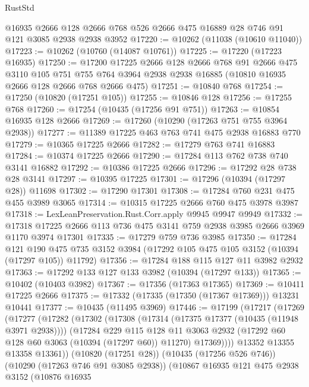 \begin{lexlean}{RustStd}
\begin{coremodule}
    @16935
    @2666
    @128
    @2666
    @768
    @526
    @2666
    @475
    @16889
    @28
    @746
    @91
    @121
    @3085
    @2938
    @2938
    @3952
@17220 := @10262 (@11038 (@10610 @11040))
@17223 := @10262 (@10760 (@14087 @10761))
@17225 := @17220 (@17223 @16935)
@17250 := @17200
    @17225
    @2666
    @128
    @2666
    @768
    @91
    @2666
    @475
    @3110
    @105
    @751
    @755
    @764
    @3964
    @2938
    @2938
    @16885
    (@10810 @16935 @2666 @128 @2666 @768 @2666 @475)
@17251 := @10840 @768
@17254 := @17250 (@10820 (@17251 @105))
@17255 := @10846 @128
@17256 := @17255 @768
@17260 := @17254 (@10435 (@17256 @91 @751))
@17263 := @10854 @16935 @128 @2666
@17269 := @17260 (@10290 (@17263 @751 @755 @3964 @2938))
@17277 := @11389 @17225 @463 @763 @741 @475 @2938 @16883 @770
@17279 := @10365 @17225 @2666
@17282 := @17279 @763 @741 @16883
@17284 := @10374 @17225 @2666
@17290 := @17284 @113 @762 @738 @740 @3141 @16882
@17292 := @10386 @17225 @2666
@17296 := @17292 @28 @738 @28 @3141
@17297 := @10395 @17225
@17301 := @17296 (@10394 (@17297 @28)) @11698
@17302 := @17290 @17301
@17308 := @17284 @760 @231 @475 @455 @3989 @3065
@17314 := @10315 @17225 @2666 @760 @475 @3978 @3987
@17318 := LexLeanPreservation.Rust.Corr.apply @9945 @9947 @9949
@17332 := @17318 @17225 @2666 @113 @736 @475 @3141 @759 @2938 @3985 @2666 @3969 @1170 @3974 @17301
@17335 := @17279 @759 @736 @3985
@17350 := @17284
    @121
    @190
    @475
    @735
    @3152
    @3984
    (@17292 @105 @475 @105 @3152 (@10394 (@17297 @105)) @11792)
@17356 := @17284 @188 @115 @127 @11 @3982 @2932
@17363 := @17292 @133 @127 @133 @3982 (@10394 (@17297 @133))
@17365 := @10402 (@10403 @3982)
@17367 := @17356 (@17363 @17365)
@17369 := @10411 @17225 @2666
@17375 := @17332 (@17335 (@17350 (@17367 @17369))) @13231 @10441
@17377 := @10435 (@11495 @3969)
@17446 := @17199
    (@17217
      (@17269
        (@17277
          (@17282
            (@17302
              (@17308
                (@17314 (@17375 @17377 (@10435 (@11948 @3971 @2938))))
                (@17284
                  @229
                  @115
                  @128
                  @11
                  @3063
                  @2932
                  (@17292 @60 @128 @60 @3063 (@10394 (@17297 @60)) @11270)
                  @17369))))
          @13352
          @13355
          @13358
          @13361))
      (@10820 (@17251 @28))
      (@10435 (@17256 @526 @746))
      (@10290 (@17263 @746 @91 @3085 @2938))
      (@10867
        @16935
        @121
        @475
        @2938
        @3152
        (@10876
          @16935

\end{coremodule}
\end{lexlean}
